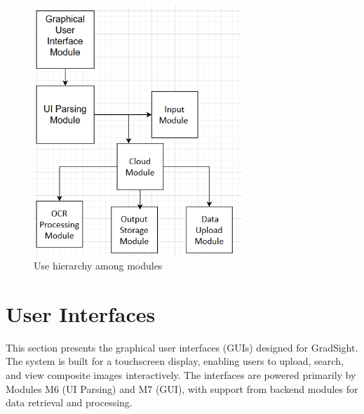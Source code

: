 \documentclass[12pt, titlepage]{article}
\begin{document}
\begin{figure}[H]
\centering
\includegraphics[width=0.7\textwidth]{image.png}
\caption{Use hierarchy among modules}
\label{FigUH}
\end{figure}


\section{User Interfaces}
\label{SecUI}

This section presents the graphical user interfaces (GUIs) designed for GradSight. The system is built for a touchscreen display, enabling users to upload, search, and view composite images interactively. The interfaces are powered primarily by Modules M6 (UI Parsing) and M7 (GUI), with support from backend modules for data retrieval and processing.
\end{document}
